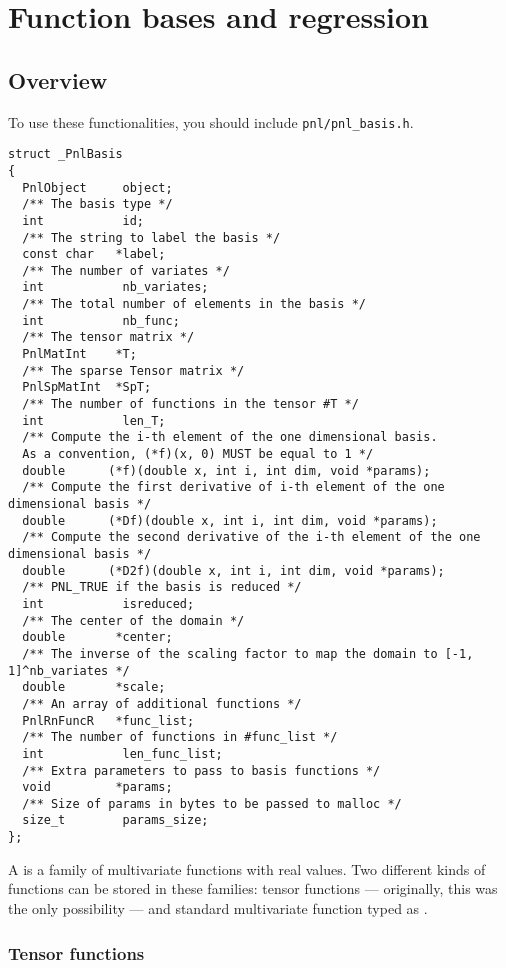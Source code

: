 \section{Function bases and regression}
\subsection{Overview}

To use these functionalities, you should include \verb!pnl/pnl_basis.h!.

\begin{lstlisting}
struct _PnlBasis
{
  PnlObject     object;
  /** The basis type */
  int           id;
  /** The string to label the basis */
  const char   *label;
  /** The number of variates */
  int           nb_variates;
  /** The total number of elements in the basis */
  int           nb_func;
  /** The tensor matrix */
  PnlMatInt    *T;
  /** The sparse Tensor matrix */
  PnlSpMatInt  *SpT;
  /** The number of functions in the tensor #T */
  int           len_T;
  /** Compute the i-th element of the one dimensional basis. 
  As a convention, (*f)(x, 0) MUST be equal to 1 */
  double      (*f)(double x, int i, int dim, void *params);
  /** Compute the first derivative of i-th element of the one dimensional basis */
  double      (*Df)(double x, int i, int dim, void *params);
  /** Compute the second derivative of the i-th element of the one dimensional basis */
  double      (*D2f)(double x, int i, int dim, void *params);
  /** PNL_TRUE if the basis is reduced */
  int           isreduced;
  /** The center of the domain */
  double       *center;
  /** The inverse of the scaling factor to map the domain to [-1, 1]^nb_variates */
  double       *scale;
  /** An array of additional functions */
  PnlRnFuncR   *func_list;
  /** The number of functions in #func_list */
  int           len_func_list;
  /** Extra parameters to pass to basis functions */
  void         *params;
  /** Size of params in bytes to be passed to malloc */
  size_t        params_size;
};
\end{lstlisting}

A  is a family of multivariate functions with real values. Two different kinds of functions can be stored in these families: tensor functions --- originally, this was the only possibility --- and standard multivariate function typed as .

\subsubsection{Tensor functions}

